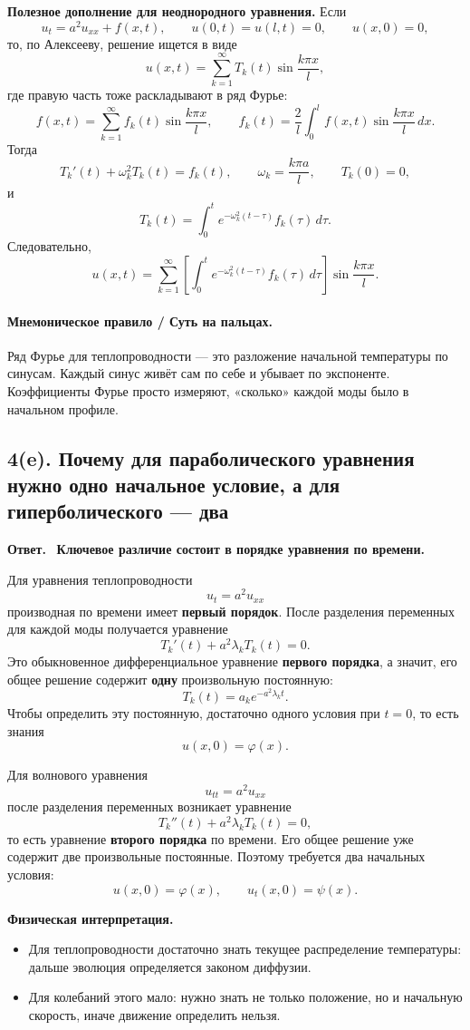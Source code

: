 \documentclass[a4paper,12pt]{article}
\newcommand{\Answer}{\textbf{Ответ.}\ }
\begin{document}
\textbf{Полезное дополнение для неоднородного уравнения.}
Если
\[
u_t=a^2u_{xx}+f(x,t),
\qquad
u(0,t)=u(l,t)=0,
\qquad
u(x,0)=0,
\]
то, по Алексееву, решение ищется в виде
\[
u(x,t)=\sum_{k=1}^{\infty}T_k(t)\sin\frac{k\pi x}{l},
\]
где правую часть тоже раскладывают в ряд Фурье:
\[
f(x,t)=\sum_{k=1}^{\infty}f_k(t)\sin\frac{k\pi x}{l},
\qquad
f_k(t)=\frac{2}{l}\int_0^l f(x,t)\sin\frac{k\pi x}{l}\,dx.
\]
Тогда
\[
T_k'(t)+\omega_k^2T_k(t)=f_k(t),
\qquad
\omega_k=\frac{k\pi a}{l},
\qquad
T_k(0)=0,
\]
и
\[
T_k(t)=\int_0^t e^{-\omega_k^2(t-\tau)}f_k(\tau)\,d\tau.
\]
Следовательно,
\[
u(x,t)=\sum_{k=1}^{\infty}
\left[
\int_0^t e^{-\omega_k^2(t-\tau)}f_k(\tau)\,d\tau
\right]
\sin\frac{k\pi x}{l}.
\]

\paragraph{Мнемоническое правило / Суть на пальцах.}
Ряд Фурье для теплопроводности --- это разложение начальной температуры по синусам. Каждый синус живёт сам по себе и убывает по экспоненте. Коэффициенты Фурье просто измеряют, «сколько» каждой моды было в начальном профиле.

\subsection*{4(e). Почему для параболического уравнения нужно одно начальное условие, а для гиперболического --- два}

\Answer
\textbf{Ключевое различие состоит в порядке уравнения по времени.}

Для уравнения теплопроводности
\[
u_t=a^2u_{xx}
\]
производная по времени имеет \textbf{первый порядок}. После разделения переменных для каждой моды получается уравнение
\[
T_k'(t)+a^2\lambda_kT_k(t)=0.
\]
Это обыкновенное дифференциальное уравнение \textbf{первого порядка}, а значит, его общее решение содержит \textbf{одну} произвольную постоянную:
\[
T_k(t)=a_ke^{-a^2\lambda_kt}.
\]
Чтобы определить эту постоянную, достаточно одного условия при $t=0$, то есть знания
\[
u(x,0)=\varphi(x).
\]

Для волнового уравнения
\[
u_{tt}=a^2u_{xx}
\]
после разделения переменных возникает уравнение
\[
T_k''(t)+a^2\lambda_kT_k(t)=0,
\]
то есть уравнение \textbf{второго порядка} по времени. Его общее решение уже содержит две произвольные постоянные. Поэтому требуется два начальных условия:
\[
u(x,0)=\varphi(x),
\qquad
u_t(x,0)=\psi(x).
\]

\textbf{Физическая интерпретация.}
\begin{itemize}
  \item Для теплопроводности достаточно знать текущее распределение температуры: дальше эволюция определяется законом диффузии.
  \item Для колебаний этого мало: нужно знать не только положение, но и начальную скорость, иначе движение определить нельзя.
\end{itemize}
\end{document}
